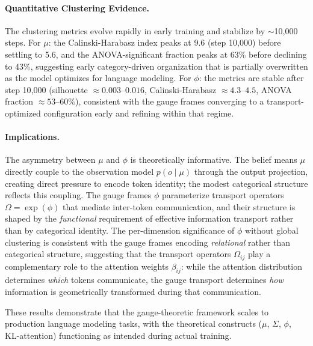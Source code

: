 \documentclass[twoside,11pt]{article}
\begin{document}
\paragraph{Quantitative Clustering Evidence.} The clustering metrics evolve rapidly in early training and stabilize by $\sim$10{,}000 steps. For $\mu$: the Calinski-Harabasz index peaks at 9.6 (step 10{,}000) before settling to 5.6, and the ANOVA-significant fraction peaks at 63\% before declining to 43\%, suggesting early category-driven organization that is partially overwritten as the model optimizes for language modeling. For $\phi$: the metrics are stable after step 10{,}000 (silhouette $\approx 0.003$--$0.016$, Calinski-Harabasz $\approx 4.3$--$4.5$, ANOVA fraction $\approx 53$--$60\%$), consistent with the gauge frames converging to a transport-optimized configuration early and refining within that regime.

\paragraph{Implications.} The asymmetry between $\mu$ and $\phi$ is theoretically informative. The belief means $\mu$ directly couple to the observation model $p(o \mid \mu)$ through the output projection, creating direct pressure to encode token identity; the modest categorical structure reflects this coupling. The gauge frames $\phi$ parameterize transport operators $\Omega = \exp(\phi)$ that mediate inter-token communication, and their structure is shaped by the \emph{functional} requirement of effective information transport rather than by categorical identity. The per-dimension significance of $\phi$ without global clustering is consistent with the gauge frames encoding \emph{relational} rather than categorical structure, suggesting that the transport operators $\Omega_{ij}$ play a complementary role to the attention weights $\beta_{ij}$: while the attention distribution determines \emph{which} tokens communicate, the gauge transport determines \emph{how} information is geometrically transformed during that communication.

These results demonstrate that the gauge-theoretic framework scales to production language modeling tasks, with the theoretical constructs ($\mu$, $\Sigma$, $\phi$, KL-attention) functioning as intended during actual training.
\end{document}
